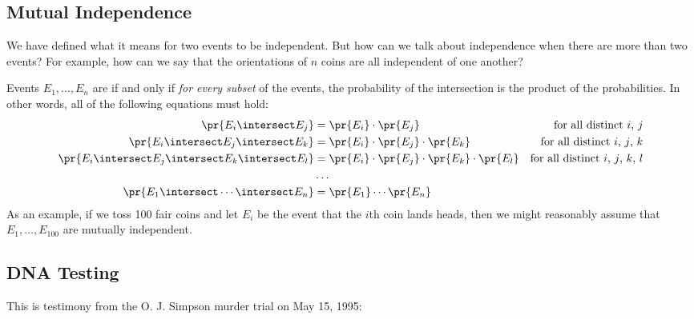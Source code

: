 \subsection{Mutual Independence}

We have defined what it means for two events to be independent.  But
how can we talk about independence when there are more than two
events?  For example, how can we say that the orientations of $n$
coins are all independent of one another?

Events $E_1, \ldots, E_n$ are  if and only
if \textit{for every subset} of the events, the probability of the
intersection is the product of the probabilities.  In other words, all
of the following equations must hold:
%
\begin{align*}
\pr{E_i \intersect E_j}
    & = \pr{E_i} \cdot \pr{E_j}
    & \text{for all distinct $i$, $j$} \\
\pr{E_i \intersect E_j \intersect E_k}
    & = \pr{E_i} \cdot \pr{E_j} \cdot \pr{E_k}
     & \text{for all distinct $i$, $j$, $k$} \\
\pr{E_i \intersect E_j \intersect E_k \intersect E_l}
    & = \pr{E_i} \cdot \pr{E_j} \cdot \pr{E_k} \cdot \pr{E_l}
    & \text{for all distinct $i$, $j$, $k$, $l$} \\
    & \ldots \\
\pr{E_1 \intersect \cdots \intersect E_n} & = \pr{E_1} \cdots \pr{E_n}
\end{align*}
%
As an example, if we toss 100 fair coins and let $E_i$ be the event
that the $i$th coin lands heads, then we might reasonably assume that
$E_1, \ldots, E_{100}$ are mutually independent.

\iffalse

\subsection{DNA Testing}

This is testimony from the O. J. Simpson murder trial on May 15, 1995:

